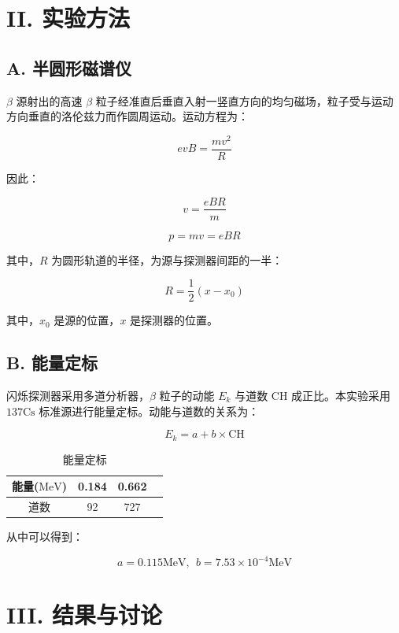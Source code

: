 \documentclass[aps,prl,preprint,groupedaddress]{revtex4-2}
\begin{document}
\section{II. 实验方法}

\subsection{A. 半圆形磁谱仪}

$\beta $ 源射出的高速 $\beta$ 粒子经准直后垂直入射一竖直方向的均匀磁场，粒子受与运动方向垂直的洛伦兹力而作圆周运动。运动方程为：

$$
evB = \frac{mv^2}{R}
$$

因此：

$$
v = \frac{eBR}{m}
$$

$$
p = mv = eBR
$$

其中，$R$ 为圆形轨道的半径，为源与探测器间距的一半：

$$
R = \frac{1}{2}(x-x_0)
$$

其中，$x_0$ 是源的位置，$x$ 是探测器的位置。

\subsection{B. 能量定标}

闪烁探测器采用多道分析器，$\beta$ 粒子的动能 $E_k$ 与道数 $\mathrm{CH}$ 成正比。本实验采用 $137\mathrm{Cs} $ 标准源进行能量定标。动能与道数的关系为：

$$
E_k = a+b\times \mathrm{CH}
$$

\begin{table}[htbp] %
	\centering %
	\caption{能量定标} %
	\begin{tabular}{|c|c|c|c|} %
	\hline %
	能量($\mathrm{MeV}$) & 0.184 &0.662 \\ %
	\hline %
	道数 &92 &727 \\ %
	\hline %
	\end{tabular}
\end{table}

从中可以得到：

$$
a = 0.115\mathrm{MeV} ,~~b = 7.53\times 10^{-4} \mathrm{MeV}
$$

\section{III. 结果与讨论}
\end{document}
